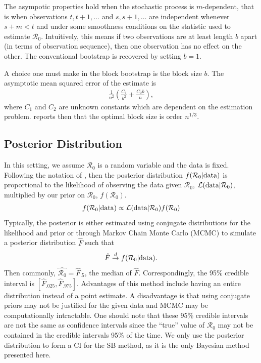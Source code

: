 \documentclass[12pt]{article}
\newcommand{\rr}{\ensuremath{\mathcal{R}_0}}
\begin{document}
The asympotic properties hold when the stochastic process is $m$-dependent, that is when observations $t, t+1, \dots$ and $s, s+1, \dots$ are independent whenever $s+m < t$ and under some smoothness conditions on the statistic used to estimate $\rr$.  Intuitively, this means if two observations are at least length $b$ apart (in terms of observation sequence), then one observation has no effect on the other. The conventional bootstrap is recovered by setting $b=1$.

A choice one must make in the block bootstrap is the block size $b$.  The asymptotic mean squared error of the estimate is
\begin{align*}
\frac{1}{n^2} \left (\frac{C_1}{b^2} + \frac{C_2b}{n} \right ),
\end{align*}
where $C_1$ and $C_2$ are unknown constants which are dependent on the estimation problem.  \cite{cao1999} reports then that the optimal block size is order $n^{1/3}$.


\subsection{Posterior Distribution}
In this setting, we assume $\rr$ is a random variable and the data is fixed.  Following the notation of \cite{wasserman2004}, then the posterior distribution $f(\rr | \textnormal{data})$ is proportional to the likelihood of observing the data given $\rr$, $\mathcal{L}(\textnormal{data}|\rr)$, multiplied by our prior on $\rr$, $f(\rr)$. 
\begin{align*}
f(\rr | \textnormal{data} ) \propto \mathcal{L}(\textnormal{data} | \rr) f(\rr)
\end{align*}
 Typically, the posterior is either estimated using conjugate distributions for the likelihood and prior or through Markov Chain Monte Carlo (MCMC) to simulate a posterior distribution $\hat{F}$ such that
\begin{align*}
\hat{F} \overset{d}{\to} f(\rr| \textnormal{data}).
\end{align*}
Then commonly, $\hat{\rr} = \hat{F}_{.5}$, the median of $\hat{F}$.  Correspondingly, the 95\% credible interval is $\left[\hat{F}_{.025}, \hat{F}_{.975} \right ]$. Advantages of this method include having an entire distribution instead of a point estimate.  A disadvantage is that using conjugate priors may not be justified for the given data and MCMC may be computationally intractable.  One should note that these 95\% credible intervals are not the same as confidence intervals since the ``true'' value of $\rr$ may not be contained in the credible intervals 95\% of the time.  We only use the posterior distribution to form a CI for the SB method, as it is the only Bayesian method presented here.  
\end{document}
